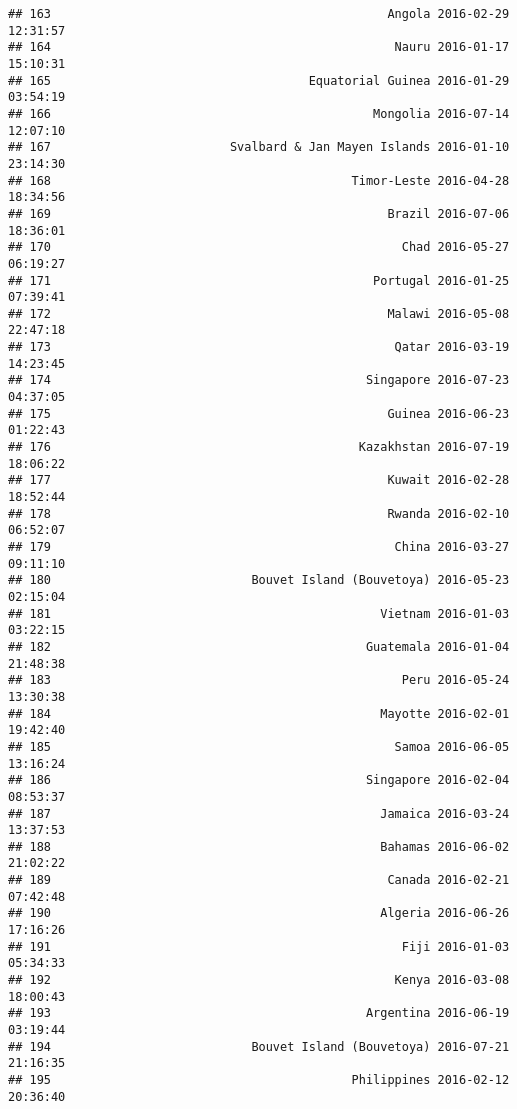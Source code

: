 \documentclass[
]{article}
\begin{document}
\begin{verbatim}
## 163                                               Angola 2016-02-29 12:31:57
## 164                                                Nauru 2016-01-17 15:10:31
## 165                                    Equatorial Guinea 2016-01-29 03:54:19
## 166                                             Mongolia 2016-07-14 12:07:10
## 167                         Svalbard & Jan Mayen Islands 2016-01-10 23:14:30
## 168                                          Timor-Leste 2016-04-28 18:34:56
## 169                                               Brazil 2016-07-06 18:36:01
## 170                                                 Chad 2016-05-27 06:19:27
## 171                                             Portugal 2016-01-25 07:39:41
## 172                                               Malawi 2016-05-08 22:47:18
## 173                                                Qatar 2016-03-19 14:23:45
## 174                                            Singapore 2016-07-23 04:37:05
## 175                                               Guinea 2016-06-23 01:22:43
## 176                                           Kazakhstan 2016-07-19 18:06:22
## 177                                               Kuwait 2016-02-28 18:52:44
## 178                                               Rwanda 2016-02-10 06:52:07
## 179                                                China 2016-03-27 09:11:10
## 180                            Bouvet Island (Bouvetoya) 2016-05-23 02:15:04
## 181                                              Vietnam 2016-01-03 03:22:15
## 182                                            Guatemala 2016-01-04 21:48:38
## 183                                                 Peru 2016-05-24 13:30:38
## 184                                              Mayotte 2016-02-01 19:42:40
## 185                                                Samoa 2016-06-05 13:16:24
## 186                                            Singapore 2016-02-04 08:53:37
## 187                                              Jamaica 2016-03-24 13:37:53
## 188                                              Bahamas 2016-06-02 21:02:22
## 189                                               Canada 2016-02-21 07:42:48
## 190                                              Algeria 2016-06-26 17:16:26
## 191                                                 Fiji 2016-01-03 05:34:33
## 192                                                Kenya 2016-03-08 18:00:43
## 193                                            Argentina 2016-06-19 03:19:44
## 194                            Bouvet Island (Bouvetoya) 2016-07-21 21:16:35
## 195                                          Philippines 2016-02-12 20:36:40

\end{verbatim}
\end{document}
